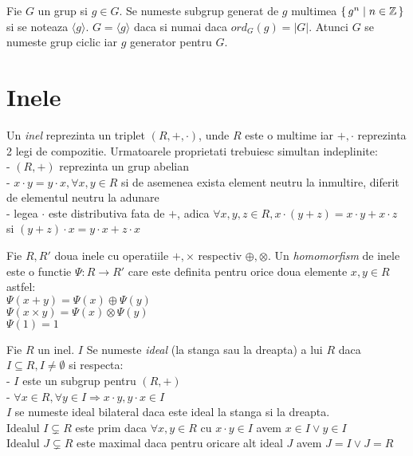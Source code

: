 \begin{dfn}
Fie $G$ un grup si $g \in G$. Se numeste subgrup generat de $g$ multimea $\set{g^n\mid n\in \mathbb{Z}}$ si se noteaza $\langle g \rangle$. $G = \langle g \rangle$ daca si numai daca $ord_G(g) = |G|$. Atunci $G$ se numeste grup ciclic iar $g$ generator pentru $G$.
\end{dfn}



\section{Inele}
\label{sec:sec02}

\begin{dfn}
Un \textit{inel} reprezinta un triplet $(R, +, \cdot)$, unde $R$ este o multime iar $+, \cdot$ reprezinta 2 legi de compozitie. Urmatoarele proprietati trebuiesc simultan indeplinite: 
\\ - $(R, +)$ reprezinta un grup abelian
\\ - $x \cdot y = y \cdot x, \forall x,y\in R$ si de asemenea exista element neutru la inmultire, diferit de elementul neutru la adunare
\\ - legea $\cdot$ este distributiva fata de $+$, adica $\forall x,y,z\in R, x\cdot (y + z) = x\cdot y + x\cdot z$ si $(y + z)\cdot x = y\cdot x + z\cdot x$ 
\end{dfn}

\begin{dfn}
Fie $R, R'$ doua inele cu operatiile $+, \times$ respectiv $\oplus, \otimes$. Un \textit{homomorfism} de inele este o functie $\Psi : R\rightarrow R'$ care este definita pentru orice doua elemente $x, y\in R$ astfel:
\\$\Psi (x+y) = \Psi (x) \oplus \Psi (y)$
\\$\Psi (x\times y) = \Psi (x) \otimes \Psi (y)$
\\$\Psi (1) = 1$
\end{dfn}

\begin{dfn}
Fie $R$ un inel. $I$ Se numeste \textit{ideal} (la stanga sau la dreapta) a lui $R$ daca $I\subseteq R, I \neq \emptyset$ si respecta:
\\ - $I$ este un subgrup pentru $(R, +)$
\\ - $\forall x\in R, \forall y\in I \Rightarrow x\cdot y, y\cdot x \in I$
\\ $I$ se numeste ideal bilateral daca este ideal la stanga si la dreapta.
\\ Idealul $I\subsetneq R$ este prim daca $\forall x, y\in R$ cu $x\cdot y\in I$ avem $x\in I \lor y \in I$
\\Idealul $J\subsetneq R$ este maximal daca pentru oricare alt ideal $J$ avem $J=I \lor J=R$
\end{dfn}

